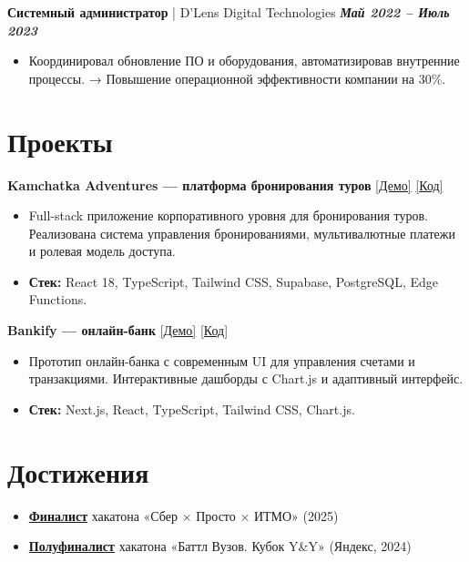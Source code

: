 \documentclass[a4paper,11pt]{article}
\newcommand{\entry}[3]{%
  \noindent\textbf{#1} | #2 \hfill \textbf{\textit{#3}} \par
}
\begin{document}
\entry{Системный администратор}{D’Lens Digital Technologies}{Май 2022 – Июль 2023}
\begin{itemize}[leftmargin=*, topsep=0.5ex, itemsep=0.2ex]
    \item Координировал обновление ПО и оборудования, автоматизировав внутренние процессы.  
    → Повышение операционной эффективности компании на 30\%.
\end{itemize}


\section*{Проекты}
\noindent\textbf{Kamchatka Adventures — платформа бронирования туров} \hfill \href{https://kamchatka-adventures.vercel.app/}{[Демо]} \quad \href{https://github.com/Jimike110/Kamchatka/}{[Код]} \\
\begin{itemize}[leftmargin=*, topsep=0.5ex, itemsep=0.2ex]
    \item Full-stack приложение корпоративного уровня для бронирования туров. Реализована система управления бронированиями, мультивалютные платежи и ролевая модель доступа.
    \item \textbf{Стек:} React 18, TypeScript, Tailwind CSS, Supabase, PostgreSQL, Edge Functions.
\end{itemize}
\vspace{1ex}

\noindent\textbf{Bankify — онлайн-банк} \hfill \href{https://bankify-jimike.vercel.app/}{[Демо]} \quad \href{https://github.com/Jimike110/bankify}{[Код]} \\
\begin{itemize}[leftmargin=*, topsep=0.5ex, itemsep=0.2ex]
    \item Прототип онлайн-банка с современным UI для управления счетами и транзакциями.  
    Интерактивные дашборды с Chart.js и адаптивный интерфейс.
    \item \textbf{Стек:} Next.js, React, TypeScript, Tailwind CSS, Chart.js.
\end{itemize}


\section*{Достижения}
\begin{itemize}[leftmargin=*, topsep=0.5ex, itemsep=0.2ex]
    \item \href{https://disk.yandex.ru/i/wE10Gv0LYPanjg}{\textbf{Финалист}} хакатона «Сбер × Просто × ИТМО» (2025)
    \item \href{https://certify.s3.yandex.net/young-yandex/74b6021d-3100-422c-b4d4-0a0d8d1833ea/4df33b64-d63d-402a-92cb-dd5955e80ff3.pdf}{\textbf{Полуфиналист}} хакатона «Баттл Вузов. Кубок Y\&Y» (Яндекс, 2024)
\end{itemize}
\end{document}
